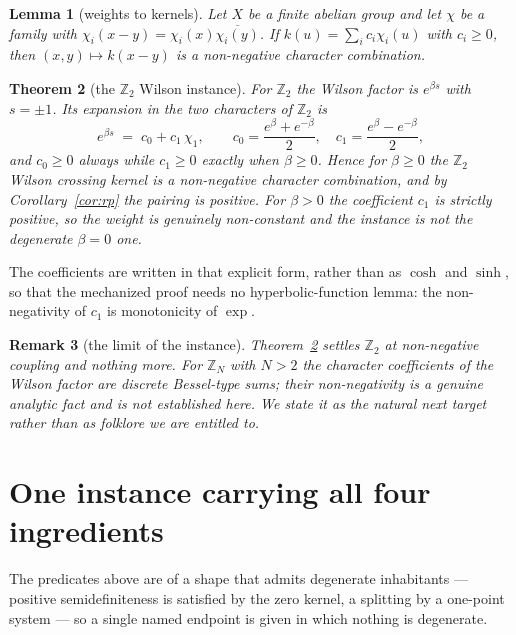 \documentclass[11pt]{article}
\newtheorem{theorem}{Theorem}[section]
\newtheorem{lemma}[theorem]{Lemma}
\newtheorem{remark}[theorem]{Remark}
\theoremstyle{definition}
\newcommand{\Z}{\mathbb{Z}}
\begin{document}
\begin{lemma}[weights to kernels]
\label{lem:conv}
Let $X$ be a finite abelian group and let $\chi$ be a family with
$\chi_i(x-y) = \chi_i(x)\overline{\chi_i(y)}$.  If $k(u) = \sum_i c_i\chi_i(u)$
with $c_i \ge 0$, then $(x,y)\mapsto k(x-y)$ is a non-negative character
combination.
\end{lemma}

\begin{theorem}[the $\Z_2$ Wilson instance]
\label{thm:z2}
For $\Z_2$ the Wilson factor is $e^{\beta s}$ with $s = \pm 1$.  Its expansion
in the two characters of $\Z_2$ is
\[
  e^{\beta s} \;=\; c_0 + c_1\,\chi_1,
  \qquad
  c_0 = \frac{e^{\beta}+e^{-\beta}}{2},
  \quad
  c_1 = \frac{e^{\beta}-e^{-\beta}}{2},
\]
and $c_0 \ge 0$ always while $c_1 \ge 0$ exactly when $\beta \ge 0$.  Hence for
$\beta \ge 0$ the $\Z_2$ Wilson crossing kernel is a non-negative character
combination, and by Corollary~\ref{cor:rp} the pairing is positive.  For
$\beta > 0$ the coefficient $c_1$ is strictly positive, so the weight is
genuinely non-constant and the instance is not the degenerate $\beta = 0$ one.
\end{theorem}

The coefficients are written in that explicit form, rather than as $\cosh$ and
$\sinh$, so that the mechanized proof needs no hyperbolic-function lemma: the
non-negativity of $c_1$ is monotonicity of $\exp$.

\begin{remark}[the limit of the instance]
\label{rem:limit}
Theorem~\ref{thm:z2} settles $\Z_2$ at non-negative coupling and nothing more.
For $\Z_N$ with $N > 2$ the character coefficients of the Wilson factor are
discrete Bessel-type sums; their non-negativity is a genuine analytic fact and
is \emph{not} established here.  We state it as the natural next target rather
than as folklore we are entitled to.
\end{remark}

\section{One instance carrying all four ingredients}
\label{sec:endpoint}

The predicates above are of a shape that admits degenerate inhabitants —
positive semidefiniteness is satisfied by the zero kernel, a splitting by a
one-point system — so a single named endpoint is given in which nothing is
degenerate.
\end{document}

